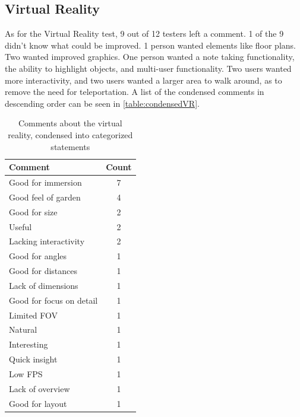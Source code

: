 \subsection*{Virtual Reality}
	As for the Virtual Reality test, 9 out of 12 testers left a comment. 1 of the 9 didn't know what could be improved. 1 person wanted elements like floor plans. Two wanted improved graphics. One person wanted a note taking functionality, the ability to highlight objects, and multi-user functionality. Two users wanted more interactivity, and two users wanted a larger area to walk around, as to remove the need for teleportation. A list of the condensed comments in descending order can be seen in \autoref{table:condensedVR}.
	\begin{table}[H]
		\centering
		\caption{Comments about the virtual reality, condensed into categorized statements}
		\label{table:condensedVR}
		\begin{tabular}{p{5cm}|c}
			Comment & Count \\ \hline
			Good for immersion & 7 \\
			Good feel of garden & 4 \\
			Good for size  & 2 \\
			Useful & 2 \\
			Lacking interactivity & 2 \\
			Good for angles & 1 \\
			Good for distances& 1 \\
			Lack of dimensions& 1 \\
			Good for focus on detail& 1 \\
			Limited FOV& 1 \\
			Natural& 1 \\
			Interesting& 1 \\
			Quick insight& 1 \\
			Low FPS& 1 \\
			Lack of overview& 1 \\
			Good for layout& 1 \\
			
		\end{tabular}
		
	\end{table}

